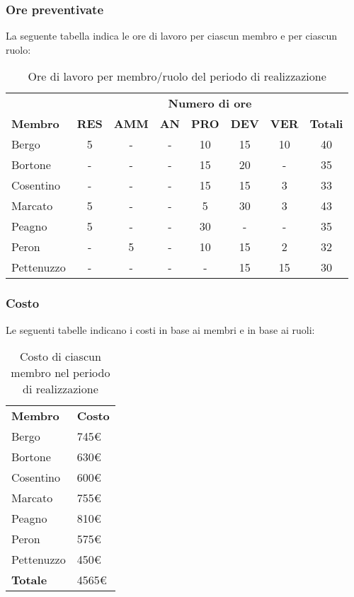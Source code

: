	\subsubsection{Ore preventivate}
		La seguente tabella indica le ore di lavoro per ciascun membro e per ciascun ruolo:
		\begin{table}[h]
			\centering
			\begin{tabular}{| l | c c c c c c | c |}
				\rowcolor{LightBlue}
				& \multicolumn{7}{c}{\textbf{\color{white}Numero di ore}}	\\
	
				\rowcolor{LightBlue}
				\textbf{\color{white}Membro}
				& \textbf{\color{white}RES}
				& \textbf{\color{white}AMM}
				& \textbf{\color{white}AN}
				& \textbf{\color{white}PRO}
				& \textbf{\color{white}DEV}
				& \textbf{\color{white}VER}
				& \textbf{\color{white}Totali}\\
	
				Bergo      & 5 & - & - & 10 & 15 & 10 & 40 \\
				Bortone    & - & - & - & 15 & 20 & - & 35  \\
				Cosentino  & - & - & - & 15 & 15 & 3 & 33 \\
				Marcato    & 5 & - & - & 5 & 30 & 3 & 43 \\
				Peagno     & 5 & - & - & 30 & - & - & 35 \\
				Peron      & - & 5 & - & 10 & 15 & 2 & 32 \\
				Pettenuzzo & - & - & - & - & 15 & 15 & 30 \\ \hline
			\end{tabular}
			\caption{Ore di lavoro per membro/ruolo del periodo di realizzazione}
		\end{table}
		
	\subsubsection{Costo}
		Le seguenti tabelle indicano i costi in base ai membri e in base ai ruoli:
		\begin{table}[h]
			\centering
			\begin{tabular}{| l | l |}
				\rowcolor{LightBlue}
				\textbf{\color{white}Membro}
				& \textbf{\color{white}Costo}\\
				
				Bergo 				& 745€\\
				Bortone 			& 630€\\
				Cosentino 		& 600€\\
				Marcato 			& 755€\\
				Peagno 			& 810€\\
				Peron 				& 575€\\
				Pettenuzzo 	& 450€\\ \hline
				\textbf{Totale} & 4565€\\ \hline
			\end{tabular}
			\caption{Costo di ciascun membro nel periodo di realizzazione}
		\end{table}
		
